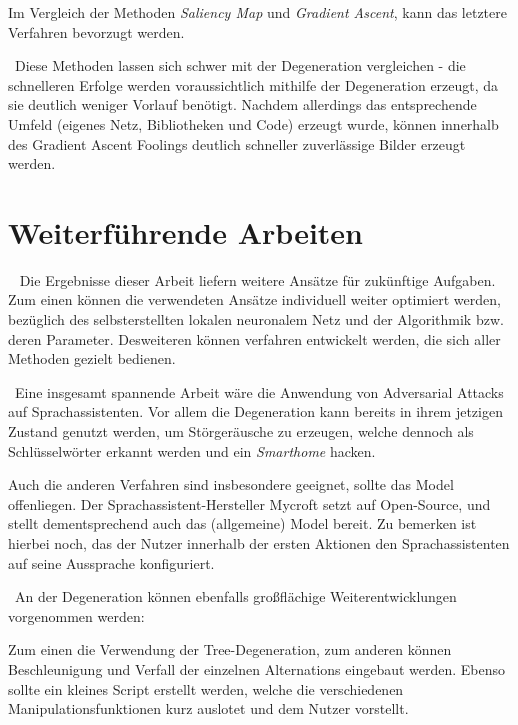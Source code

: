 Im Vergleich der Methoden \textit{Saliency Map} und \textit{Gradient Ascent}, kann das letztere Verfahren bevorzugt werden. 

~\newline Diese Methoden lassen sich schwer mit der Degeneration vergleichen - die schnelleren Erfolge werden voraussichtlich mithilfe der Degeneration erzeugt, da sie deutlich weniger Vorlauf benötigt.
Nachdem allerdings das entsprechende Umfeld (eigenes Netz, Bibliotheken und Code) erzeugt wurde, können innerhalb des Gradient Ascent Foolings deutlich schneller zuverlässige Bilder erzeugt werden.  



\section{Weiterführende Arbeiten}~\newline 
Die Ergebnisse dieser Arbeit liefern weitere Ansätze für zukünftige Aufgaben. Zum einen können die verwendeten Ansätze individuell weiter optimiert werden, bezüglich des selbsterstellten lokalen neuronalem Netz und der Algorithmik bzw. deren Parameter. Desweiteren können verfahren entwickelt werden, die sich aller Methoden gezielt bedienen. 

~\newline Eine insgesamt spannende Arbeit wäre die Anwendung von Adversarial Attacks auf Sprachassistenten. 
Vor allem die Degeneration kann bereits in ihrem jetzigen Zustand genutzt werden, um Störgeräusche zu erzeugen, welche dennoch als Schlüsselwörter erkannt werden und ein \textit{Smarthome} hacken. 

Auch die anderen Verfahren sind insbesondere geeignet, sollte das Model offenliegen. Der Sprachassistent-Hersteller Mycroft setzt auf Open-Source, und stellt dementsprechend auch das (allgemeine) Model bereit. 
Zu bemerken ist hierbei noch, das der Nutzer innerhalb der ersten Aktionen den Sprachassistenten auf seine Aussprache konfiguriert.  

~\newline An der Degeneration können ebenfalls großflächige Weiterentwicklungen vorgenommen werden: 

Zum einen die Verwendung der Tree-Degeneration, zum anderen können Beschleunigung und Verfall der einzelnen Alternations eingebaut werden. Ebenso sollte ein kleines Script erstellt werden, welche die verschiedenen Manipulationsfunktionen kurz auslotet und dem Nutzer vorstellt. 

